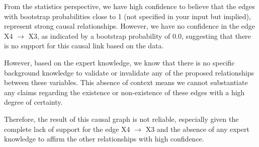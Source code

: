 \documentclass{article}
\begin{document}
From the statistics perspective, we have high confidence to believe that the edges with bootstrap probabilities close to 1 (not specified in your input but implied), represent strong causal relationships. However, we have no confidence in the edge X4 $\rightarrow$ X3, as indicated by a bootstrap probability of 0.0, suggesting that there is no support for this causal link based on the data. 

However, based on the expert knowledge, we know that there is no specific background knowledge to validate or invalidate any of the proposed relationships between these variables. This absence of context means we cannot substantiate any claims regarding the existence or non-existence of these edges with a high degree of certainty.

Therefore, the result of this causal graph is not reliable, especially given the complete lack of support for the edge X4 $\rightarrow$ X3 and the absence of any expert knowledge to affirm the other relationships with high confidence.
\end{document}
